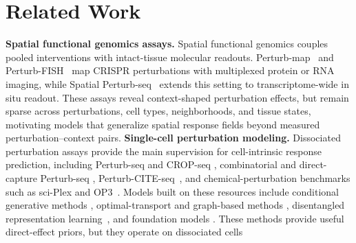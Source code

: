 \documentclass[sigconf,review,balance=false]{acmart}
\newcommand{\methodname}{\textsc{Spine}\xspace}
\begin{document}
\section{Related Work}
\textbf{Spatial functional genomics assays.}
Spatial functional genomics couples pooled interventions with intact-tissue molecular
readouts. Perturb-map~\citep{dhainaut2022spatialcrispr} and
Perturb-FISH~\citep{binan2025perturbfish} map CRISPR perturbations with multiplexed
protein or RNA imaging, while Spatial Perturb-seq~\citep{shen2026spatialperturbseq}
extends this setting to transcriptome-wide in situ readout. These assays reveal
context-shaped perturbation effects, but remain sparse across perturbations,
cell types, neighborhoods, and tissue states, motivating models that generalize
spatial response fields beyond measured perturbation--context pairs.
\textbf{Single-cell perturbation modeling.}
Dissociated perturbation assays provide the main supervision for cell-intrinsic
response prediction, including Perturb-seq and CROP-seq
\citep{dixit2016perturbseq,adamson2016crispr,datlinger2017cropsseq}, combinatorial
and direct-capture Perturb-seq
\citep{norman2019combinatorial,replogle2020directcapture,replogle2022mapping},
Perturb-CITE-seq~\citep{frangieh2021multimodal}, and chemical-perturbation
benchmarks such as sci-Plex and OP3~\citep{srivatsan2020massively,szalata2024op3}.
Models built on these resources include conditional generative methods
\citep{lotfollahi2019scgen,lotfollahi2020trvae,Lotfollahi2023,hetzel2022chemcpa,kana2023scvidr,yu2025perturbnet},
optimal-transport and graph-based methods \citep{bunne2023cellot,roohani2023gears},
disentangled representation learning~\citep{piran2024biolord}, and foundation
models \citep{theodoris2023geneformer,cui2024scgpt,hao2024scfoundation}. These
methods provide useful direct-effect priors, but they operate on dissociated cells
\end{document}
